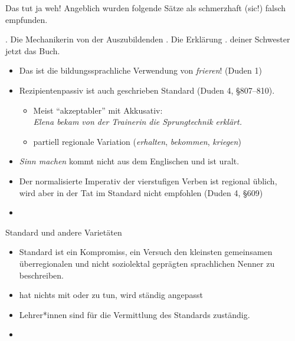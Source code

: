 \begin{frame}
  {Das tut ja weh!}
  \pause
  Angeblich wurden folgende Sätze als schmerzhaft (sic!) falsch empfunden.
  \pause
  \Viertelzeile
  \begin{exe}
    \ex {}.
    \pause
    \ex Die Mechanikerin  von der Auszubildenden .
    \pause
    \ex Die Erklärung .
    \pause
    \ex {} deiner Schwester jetzt das Buch.
  \end{exe}
  \pause
  \begin{itemize}[<+->]
    \item Das ist die bildungssprachliche Verwendung von \textit{frieren}! (Duden 1)
    \item \alert{Rezipientenpassiv ist auch geschrieben Standard} (Duden 4, §807–810).
      \begin{itemize}[<+->]
        \item Meist "`akzeptabler"' mit Akkusativ:\\
          \textit{Elena bekam von der Trainerin die Sprungtechnik erklärt.}
        \item partiell \alert{regionale Variation} (\textit{erhalten}, \textit{bekommen}, \textit{kriegen})
      \end{itemize}
    \item \textit{Sinn machen} kommt nicht aus dem Englischen und ist uralt.
    \item \alert{Der normalisierte Imperativ der vierstufigen Verben ist regional üblich},\\
      wird aber in der Tat im Standard nicht empfohlen (Duden 4, §609)
    \item {}
  \end{itemize}
\end{frame}

\begin{frame}
  {Standard und andere Varietäten}
  \pause
  \begin{itemize}[<+->]
    \item Standard ist ein \alert{Kompromiss}, ein \alert{Versuch} den kleinsten gemeinsamen \alert{überregionalen und nicht soziolektal geprägten sprachlichen} Nenner zu beschreiben.
    \item hat nichts mit  oder  zu tun, wird \alert{ständig angepasst}
      \Halbzeile
    \item \alert{Lehrer*innen sind für die Vermittlung des Standards zuständig.}
    \item {}
  \end{itemize}
\end{frame}


